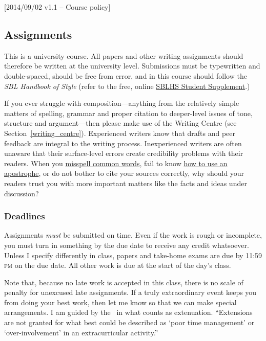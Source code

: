 [2014/09/02 v1.1 -- Course policy]

\subsection{Assignments}
\label{assignments}

This is a university course. All papers and other writing assignments
should therefore be written at the university level. Submissions must be
typewritten and double-spaced, should be free from error, and in this course
should follow the \emph{SBL Handbook of Style} (refer to the free, online
\href{https://www.sbl-site.org/assets/pdfs/pubs/SBLHSsupp2015-02.pdf}{SBLHS
Student Supplement}.)

If you ever struggle with composition---anything from the relatively simple
matters of spelling, grammar and proper citation to deeper-level issues of
tone, structure and argument---then please make use of the Writing Centre (see
Section~\ref{writing_centre}). Experienced writers know that drafts and peer
feedback are integral to the writing process. Inexperienced writers are often
unaware that their surface-level errors create credibility problems with their
readers. When you \href{http://theoatmeal.com/comics/misspelling}{misspell
common words}, fail to know \href{http://theoatmeal.com/comics/apostrophe}{how
to use an apostrophe}, or do not bother to cite your sources correctly, why
should your readers trust you with more important matters like the facts and
ideas under discussion?

\subsubsection{Deadlines}
\label{deadlines}

Assignments \emph{must} be submitted on time. Even if the work is rough or
incomplete, you must turn in something by the due date to receive any credit
whatsoever. Unless I specify differently in class, papers and take-home exams
are due by 11:59 \textsc{pm} on the due date. All other work is due at the
start of the day's class.

Note that, because no late work is accepted in this class, there is no scale
of penalty for unexcused late assignments. If a truly extraordinary event
keeps you from doing your best work, then let me know so that we can make
special arrangements. I am guided by the \AC\ in what counts as extenuation.
``Extensions are not granted for what best could be described as `poor time
management' or `over-involvement' in an extracurricular activity.''


